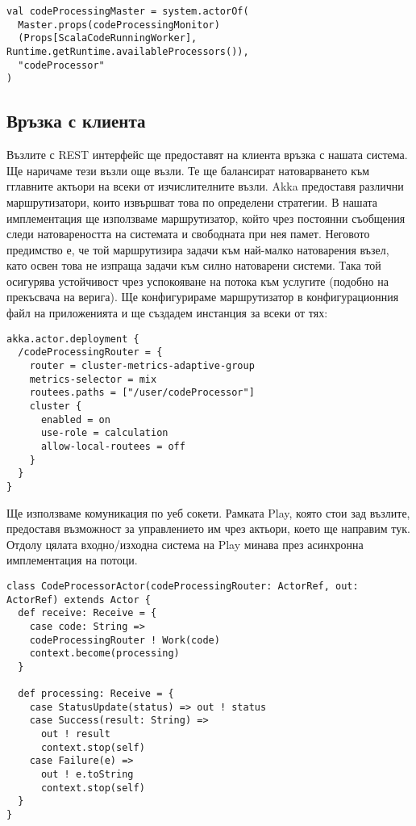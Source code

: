 \begin{lstlisting}
val codeProcessingMaster = system.actorOf(
  Master.props(codeProcessingMonitor)
  (Props[ScalaCodeRunningWorker], Runtime.getRuntime.availableProcessors()),
  "codeProcessor"
)
\end{lstlisting}

\subsection{Връзка с клиента}

Възлите с REST интерфейс ще предоставят на клиента връзка с нашата система. Ще наричаме тези възли още  възли. Те ще балансират натоварването към гглавните актьори на всеки от изчислителните възли. Akka предоставя различни маршрутизатори, които извършват това по определени стратегии. В нашата имплементация ще използваме маршрутизатор, който чрез постоянни съобщения следи натовареността на системата и свободната при нея памет. Неговото предимство е, че той маршрутизира задачи към най-малко натоварения възел, като освен това не изпраща задачи към силно натоварени системи. Така той осигурява устойчивост чрез успокояване на потока към услугите (подобно на прекъсвача на верига). Ще конфигурираме маршрутизатор в конфигурационния файл на  приложенията и ще създадем инстанция за всеки от тях:

\begin{lstlisting}
akka.actor.deployment {
  /codeProcessingRouter = {
    router = cluster-metrics-adaptive-group
    metrics-selector = mix
    routees.paths = ["/user/codeProcessor"]
    cluster {
      enabled = on
      use-role = calculation
      allow-local-routees = off
    }
  }
}
\end{lstlisting}

Ще използваме комуникация по уеб сокети. Рамката Play, която стои зад  възлите, предоставя възможност за управлението им чрез актьори, което ще направим тук. Отдолу цялата входно/изходна система на Play минава през асинхронна  имплементация на потоци.

\begin{lstlisting}
class CodeProcessorActor(codeProcessingRouter: ActorRef, out: ActorRef) extends Actor {
  def receive: Receive = {
    case code: String =>
    codeProcessingRouter ! Work(code)
    context.become(processing)
  }
    
  def processing: Receive = {
    case StatusUpdate(status) => out ! status
    case Success(result: String) =>
      out ! result
      context.stop(self)
    case Failure(e) =>
      out ! e.toString
      context.stop(self)
  }
}
\end{lstlisting}

